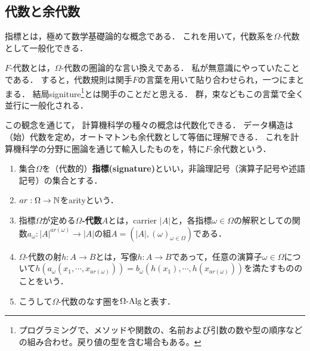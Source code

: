 \documentclass[uplatex, dvipdfmx]{jsreport}
\begin{document}
\subsection{代数と余代数}

\begin{tcolorbox}[colframe=ForestGreen, colback=ForestGreen!10!white, breakable,
    title=signature]
    指標とは，極めて数学基礎論的な概念である．
    これを用いて，代数系を$\Omega$-代数として一般化できる．

    $F$-代数とは，$\Omega$-代数の圏論的な言い換えである．
    私が無意識にやっていたことである．
    すると，代数規則は関手$F$の言葉を用いて貼り合わせられ，一つにまとまる．
    結局signiture\footnote{プログラミングで、メソッドや関数の、名前および引数の数や型の順序などの組み合わせ。戻り値の型を含む場合もある。}とは関手のことだと思える．
    群，束などもこの言葉で全く並行に一般化される．

    この観念を通じて，
    計算機科学の種々の概念は代数化できる．
    データ構造は（始）代数を定め，オートマトンも余代数として等価に理解できる．
    これを計算機科学の分野に圏論を通じて輸入したものを，特に$F$-余代数という．
\end{tcolorbox}

\begin{definition}\mbox{}
    \begin{enumerate}
        \item 集合$\Omega$を（代数的）\textbf{指標(signature)}といい，非論理記号（演算子記号や述語記号）の集合とする．
        \item $ar:\Omega\to\mathbb{N}$をarityという．
        \item 指標$\Omega$が定める\textbf{$\Omega$-代数}$A$とは，carrier $|A|$と，各指標$\omega\in\Omega$の解釈としての関数$a_\omega:|A|^{ar(\omega)}\to|A|$の組$A=(|A|,(\omega)_{\omega\in\Omega})$である．
        \item $\Omega$-代数の射$h:A\to B$とは，写像$h:A\to B$であって，任意の演算子$\omega\in\Omega$について$h(a_\omega(x_1,\cdots,x_{ar(\omega)}))=b_\omega(h(x_1),\cdots,h(x_{ar(\omega)}))$を満たすもののことをいう．
        \item こうして$\Omega$-代数のなす圏を$\OmegaAlg$と表す．
    \end{enumerate}
\end{definition}
\end{document}
